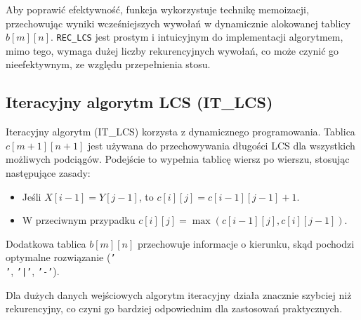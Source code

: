 \documentclass{article}
\begin{document}
	Aby poprawić efektywność, funkcja wykorzystuje technikę memoizacji, przechowując wyniki wcześniejszych wywołań w dynamicznie alokowanej tablicy $b[m][n]$.
	\texttt{REC\_LCS} jest prostym i intuicyjnym do implementacji algorytmem, mimo tego, wymaga dużej liczby rekurencyjnych wywołań, co może czynić go nieefektywnym, ze względu przepełnienia stosu.
	
	\subsection{Iteracyjny algorytm LCS (IT\_LCS)}
	Iteracyjny algorytm (IT\_LCS) korzysta z dynamicznego programowania. Tablica $c[m+1][n+1]$ jest używana do przechowywania długości LCS dla wszystkich możliwych podciągów. Podejście to wypełnia tablicę wiersz po wierszu, stosując następujące zasady:
	\begin{itemize}
		\item Jeśli $X[i-1] = Y[j-1]$, to $c[i][j] = c[i-1][j-1] + 1$.
		\item W przeciwnym przypadku $c[i][j] = \max(c[i-1][j], c[i][j-1])$.
	\end{itemize}
	
	Dodatkowa tablica $b[m][n]$ przechowuje informacje o kierunku, skąd pochodzi optymalne rozwiązanie (\texttt{'\\'}, \texttt{'|'}, \texttt{'-'}).

	
	
Dla dużych danych wejściowych algorytm iteracyjny działa znacznie szybciej niż rekurencyjny, co czyni go bardziej odpowiednim dla zastosowań praktycznych.
	\begin{table}[H]
		\caption{Porównanie czasów wykonania algorytmu rekurencyjnego i iteracyjnego LCS dla różnych długości ciągów.}
		\label{tab:lcs_comparison}

	\end{table}
	
\end{document}
